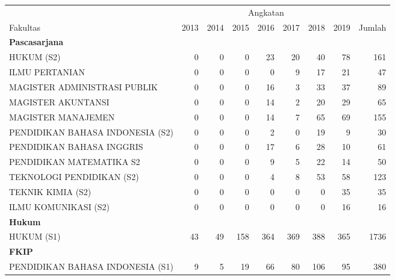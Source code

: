 \documentclass[
]{book}
\begin{document}
\begin{table}[H]
\centering
\begin{tabular}{l|r|r|r|r|r|r|r|r}
\hline
\multicolumn{1}{c|}{ } & \multicolumn{7}{c|}{Angkatan} & \multicolumn{1}{c}{ } \\
\cline{2-8}
Fakultas & 2013 & 2014 & 2015 & 2016 & 2017 & 2018 & 2019 & Jumlah\\
\hline
\multicolumn{9}{l}{\textbf{Pascasarjana}}\\
\hline
\hspace{1em}HUKUM (S2) & 0 & 0 & 0 & 23 & 20 & 40 & 78 & 161\\
\hline
\hspace{1em}ILMU PERTANIAN & 0 & 0 & 0 & 0 & 9 & 17 & 21 & 47\\
\hline
\hspace{1em}MAGISTER ADMINISTRASI PUBLIK & 0 & 0 & 0 & 16 & 3 & 33 & 37 & 89\\
\hline
\hspace{1em}MAGISTER AKUNTANSI & 0 & 0 & 0 & 14 & 2 & 20 & 29 & 65\\
\hline
\hspace{1em}MAGISTER MANAJEMEN & 0 & 0 & 0 & 14 & 7 & 65 & 69 & 155\\
\hline
\hspace{1em}PENDIDIKAN BAHASA INDONESIA (S2) & 0 & 0 & 0 & 2 & 0 & 19 & 9 & 30\\
\hline
\hspace{1em}PENDIDIKAN BAHASA INGGRIS & 0 & 0 & 0 & 17 & 6 & 28 & 10 & 61\\
\hline
\hspace{1em}PENDIDIKAN MATEMATIKA S2 & 0 & 0 & 0 & 9 & 5 & 22 & 14 & 50\\
\hline
\hspace{1em}TEKNOLOGI PENDIDIKAN (S2) & 0 & 0 & 0 & 4 & 8 & 53 & 58 & 123\\
\hline
\hspace{1em}TEKNIK KIMIA (S2) & 0 & 0 & 0 & 0 & 0 & 0 & 35 & 35\\
\hline
\hspace{1em}ILMU KOMUNIKASI (S2) & 0 & 0 & 0 & 0 & 0 & 0 & 16 & 16\\
\hline
\multicolumn{9}{l}{\textbf{Hukum}}\\
\hline
\hspace{1em}HUKUM (S1) & 43 & 49 & 158 & 364 & 369 & 388 & 365 & 1736\\
\hline
\multicolumn{9}{l}{\textbf{FKIP}}\\
\hline
\hspace{1em}PENDIDIKAN BAHASA INDONESIA (S1) & 9 & 5 & 19 & 66 & 80 & 106 & 95 & 380\\

\end{tabular}
\end{table}
\end{document}
